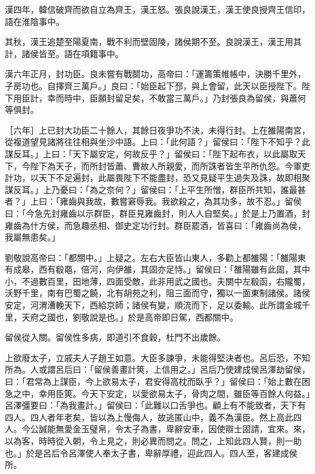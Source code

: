 \begin{pinyinscope}
漢四年，韓信破齊而欲自立為齊王，漢王怒。張良說漢王，漢王使良授齊王信印，語在淮陰事中。

其秋，漢王追楚至陽夏南，戰不利而壁固陵，諸侯期不至。良說漢王，漢王用其計，諸侯皆至。語在項籍事中。

漢六年正月，封功臣。良未嘗有戰鬬功，高帝曰：「運籌策帷帳中，決勝千里外，子房功也。自擇齊三萬戶。」良曰：「始臣起下邳，與上會留，此天以臣授陛下。陛下用臣計，幸而時中，臣願封留足矣，不敢當三萬戶。」乃封張良為留侯，與蕭何等俱封。

［六年］上已封大功臣二十餘人，其餘日夜爭功不決，未得行封。上在雒陽南宮，從複道望見諸將往往相與坐沙中語。上曰：「此何語？」留侯曰：「陛下不知乎？此謀反耳。」上曰：「天下屬安定，何故反乎？」留侯曰：「陛下起布衣，以此屬取天下，今陛下為天子，而所封皆蕭、曹故人所親愛，而所誅者皆生平所仇怨。今軍吏計功，以天下不足遍封，此屬畏陛下不能盡封，恐又見疑平生過失及誅，故即相聚謀反耳。」上乃憂曰：「為之奈何？」留侯曰：「上平生所憎，群臣所共知，誰最甚者？」上曰：「雍齒與我故，數嘗窘辱我。我欲殺之，為其功多，故不忍。」留侯曰：「今急先封雍齒以示群臣，群臣見雍齒封，則人人自堅矣。」於是上乃置酒，封雍齒為什方侯，而急趣丞相、御史定功行封。群臣罷酒，皆喜曰：「雍齒尚為侯，我屬無患矣。」

劉敬說高帝曰：「都關中。」上疑之。左右大臣皆山東人，多勸上都雒陽：「雒陽東有成皋，西有殽黽，倍河，向伊雒，其固亦足恃。」留侯曰：「雒陽雖有此固，其中小，不過數百里，田地薄，四面受敵，此非用武之國也。夫關中左殽函，右隴蜀，沃野千里，南有巴蜀之饒，北有胡苑之利，阻三面而守，獨以一面東制諸侯。諸侯安定，河渭漕輓天下，西給京師；諸侯有變，順流而下，足以委輸。此所謂金城千里，天府之國也，劉敬說是也。」於是高帝即日駕，西都關中。

留侯從入關。留侯性多病，即道引不食穀，杜門不出歲餘。

上欲廢太子，立戚夫人子趙王如意。大臣多諫爭，未能得堅決者也。呂后恐，不知所為。人或謂呂后曰：「留侯善畫計筴，上信用之。」呂后乃使建成侯呂澤劫留侯，曰：「君常為上謀臣，今上欲易太子，君安得高枕而臥乎？」留侯曰：「始上數在困急之中，幸用臣筴。今天下安定，以愛欲易太子，骨肉之間，雖臣等百餘人何益。」呂澤彊要曰：「為我畫計。」留侯曰：「此難以口舌爭也。顧上有不能致者，天下有四人。四人者年老矣，皆以為上慢侮人，故逃匿山中，義不為漢臣。然上高此四人。今公誠能無愛金玉璧帛，令太子為書，卑辭安車，因使辯士固請，宜來。來，以為客，時時從入朝，令上見之，則必異而問之。問之，上知此四人賢，則一助也。」於是呂后令呂澤使人奉太子書，卑辭厚禮，迎此四人。四人至，客建成侯所。


\end{pinyinscope}
